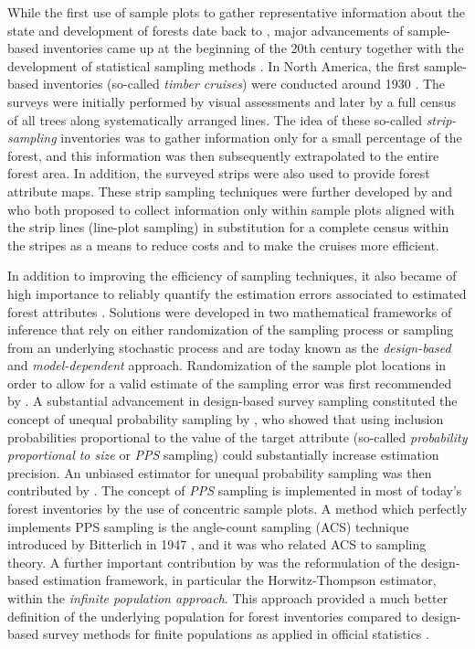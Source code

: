 While the first use of sample plots to gather representative information about the state and development of forests date back to \citet{hartig1795}, major advancements of sample-based inventories came up at the beginning of the 20th century together with the development of statistical sampling methods \citep{schreuder1993}. In North America, the first sample-based inventories (so-called \textit{timber cruises}) were conducted around 1930 \citep{kangas2006}. The surveys were initially performed by visual assessments and later by a full census of all trees along systematically arranged lines. The idea of these so-called \textit{strip-sampling} inventories was to gather information only for a small percentage of the forest, and this information was then subsequently extrapolated to the entire forest area. In addition, the surveyed strips were also used to provide forest attribute maps. These strip sampling techniques were further developed by \citet{goodspeed1934} and \citet{langballe1938} who both proposed to collect information only within sample plots aligned with the strip lines (line-plot sampling) in substitution for a complete census within the stripes as a means to reduce costs and to make the cruises more efficient.\par 

In addition to improving the efficiency of sampling techniques, it also became of high importance to reliably quantify the estimation errors associated to estimated forest attributes \citep{kangas2006}. Solutions were developed in two mathematical frameworks of inference that rely on either randomization of the sampling process or sampling from an underlying stochastic process and are today known as the \textit{design-based} and \textit{model-dependent} approach. Randomization of the sample plot locations in order to allow for a valid estimate of the sampling error was first recommended by \citet{hasel1938}. A substantial advancement in design-based survey sampling constituted the concept of unequal probability sampling by \citet{hansen1943}, who showed that using inclusion probabilities proportional to the value of the target attribute (so-called \textit{probability proportional to size} or \textit{PPS} sampling) could substantially increase estimation precision. An unbiased estimator for unequal probability sampling was then contributed by \citet{horvitz1952}. The concept of \textit{PPS} sampling is implemented in most of today's forest inventories by the use of concentric sample plots. A method which perfectly implements PPS sampling is the angle-count sampling (ACS) technique introduced by Bitterlich in 1947 \citep{bitterlich1984}, and it was \citet{grosenbaugh1958} who related ACS to sampling theory. A further important contribution by \citet{mandallaz1991} was the reformulation of the design-based estimation framework, in particular the Horwitz-Thompson estimator, within the \textit{infinite population approach}. This approach provided a much better definition of the underlying population for forest inventories compared to design-based survey methods for finite populations as applied in official statistics \citep[e.g.,][]{sarndal2003}.\par

